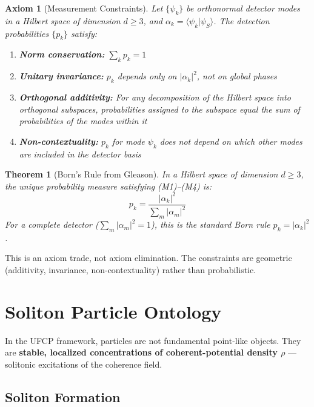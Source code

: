 \documentclass[11pt, a4paper]{article}
\newtheorem{axiom}{Axiom}[section]
\newtheorem{theorem}{Theorem}[section]
\begin{document}
\begin{axiom}[Measurement Constraints]
Let $\{\psi_k\}$ be orthonormal detector modes in a Hilbert space
of dimension $d \geq 3$, and
$\alpha_k = \langle \psi_k | \psi_S \rangle$. The detection
probabilities $\{p_k\}$ satisfy:
\begin{enumerate}[label=(M\arabic*)]
  \item \textbf{Norm conservation:} $\sum_k p_k = 1$
  \item \textbf{Unitary invariance:} $p_k$ depends only on
        $|\alpha_k|^2$, not on global phases
  \item \textbf{Orthogonal additivity:} For any decomposition of
        the Hilbert space into orthogonal subspaces, probabilities
        assigned to the subspace equal the sum of probabilities of
        the modes within it
  \item \textbf{Non-contextuality:} $p_k$ for mode $\psi_k$ does
        not depend on which other modes are included in the detector
        basis
\end{enumerate}
\end{axiom}

\begin{theorem}[Born's Rule from Gleason]
In a Hilbert space of dimension $d \geq 3$, the unique probability
measure satisfying (M1)--(M4) is:
\begin{equation}
  p_k = \frac{|\alpha_k|^2}{\sum_m |\alpha_m|^2}
\end{equation}
For a complete detector ($\sum_m |\alpha_m|^2 = 1$), this is the
standard Born rule $p_k = |\alpha_k|^2$.
\end{theorem}

This is an axiom trade, not axiom elimination. The constraints are
geometric (additivity, invariance, non-contextuality) rather than
probabilistic.

\section{Soliton Particle Ontology}

In the UFCP framework, particles are not fundamental point-like
objects. They are \textbf{stable, localized concentrations of
coherent-potential density $\rho$} --- solitonic excitations of
the coherence field.

\subsection{Soliton Formation}
\end{document}
